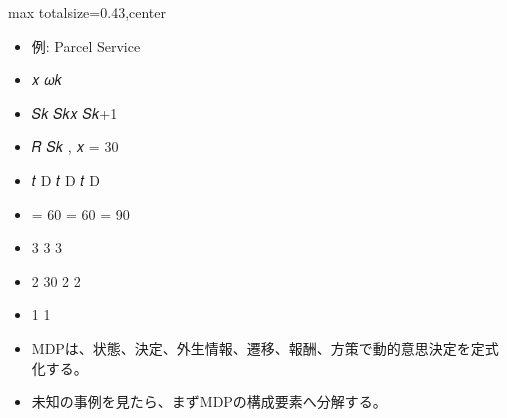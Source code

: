 \clearpage
{}
\begin{minipage}[t]{0.405\textwidth}
\begin{adjustbox}{max totalsize={\textwidth}{0.43\textheight},center}
\begin{minipage}{\textwidth}\scriptsize
{}\begin{itemize}
\item 例: Parcel Service
\item 𝑥 𝜔𝑘
\item 𝑆𝑘 𝑆𝑘𝑥 𝑆𝑘+1
\item 𝑅 𝑆𝑘 , 𝑥 = 30
\item 𝑡 D 𝑡 D 𝑡 D
\item = 60 = 60 = 90
\item 3 3 3
\item 2 30 2 2
\item 1 1
\end{itemize}\begin{itemize}
\item MDPは、状態、決定、外生情報、遷移、報酬、方策で動的意思決定を定式化する。
\item 未知の事例を見たら、まずMDPの構成要素へ分解する。
\end{itemize}
\end{minipage}
\end{adjustbox}
\end{minipage}\hfill

